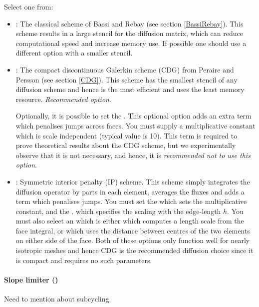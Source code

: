 Select one from:
\begin{itemize}
\item {}: The classical scheme of Bassi and Rebay (see
  section \ref{BassiRebay}). This scheme results in a large stencil
  for the diffusion matrix, which can reduce computational speed and
  increase memory use. If possible one should use a different option
  with a smaller stencil.
\item {}: The compact
  discontinuous Galerkin scheme (CDG) from Peraire and Persson
  \citep{peraire2008} (see section \ref{CDG}). This scheme has the
  smallest stencil of any diffusion scheme and hence is the most
  efficient and uses the least memory resource. \emph{Recommended
    option}.

  Optionally, it is possible to set the
  . This
  optional option adds an extra term which penalises jumps across
  faces. You must supply a multiplicative constant which is scale
  independent (typical value is 10). This term is required to prove
  theoretical results about the CDG scheme, but we experimentally
  observe that it is not necessary, and hence, it is \emph{recommended
    not to use this option}.
\item {}: Symmetric interior penalty (IP)
  scheme. This scheme simply integrates the diffusion operator by
  parts in each element, averages the fluxes and adds a term which
  penalises jumps. You must set the 
   which sets the
  multiplicative constant, and the .
  which specifies the scaling with the edge-length $h$. You must also
  select an  which is either
   which computes a length scale from the
  face integral, or  which uses the
  distance between centres of the two elements on either side of the
  face. Both of these options only function well for nearly isotropic
  meshes and hence CDG is the recommended diffusion choice since it 
  is compact and requires no such parameters.
\end{itemize}

\paragraph{Slope limiter ()}
Need to mention about subcycling.
